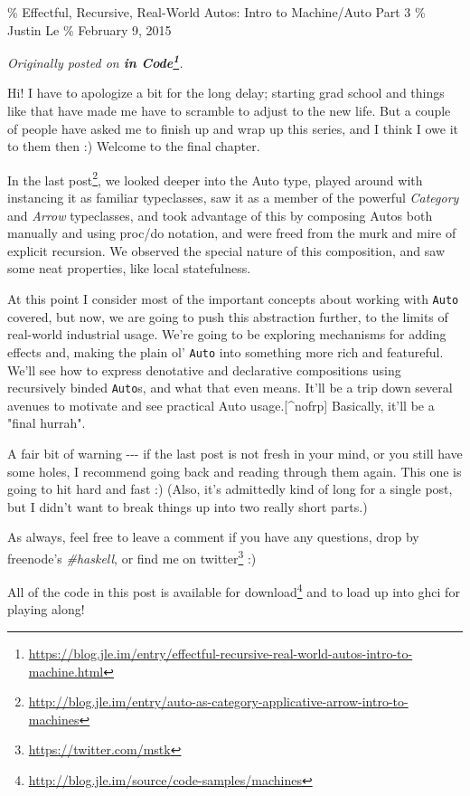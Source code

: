 \documentclass[]{article}
\renewcommand{\href}[2]{#2\footnote{\url{#1}}}
\begin{document}
\% Effectful, Recursive, Real-World Autos: Intro to Machine/Auto Part 3 \%
Justin Le \% February 9, 2015

\emph{Originally posted on
\textbf{\href{https://blog.jle.im/entry/effectful-recursive-real-world-autos-intro-to-machine.html}{in
Code}}.}

Hi! I have to apologize a bit for the long delay; starting grad school and
things like that have made me have to scramble to adjust to the new life. But a
couple of people have asked me to finish up and wrap up this series, and I think
I owe it to them then :) Welcome to the final chapter.

In the
\href{http://blog.jle.im/entry/auto-as-category-applicative-arrow-intro-to-machines}{last
post}, we looked deeper into the Auto type, played around with instancing it as
familiar typeclasses, saw it as a member of the powerful \emph{Category} and
\emph{Arrow} typeclasses, and took advantage of this by composing Autos both
manually and using proc/do notation, and were freed from the murk and mire of
explicit recursion. We observed the special nature of this composition, and saw
some neat properties, like local statefulness.

At this point I consider most of the important concepts about working with
\texttt{Auto} covered, but now, we are going to push this abstraction further,
to the limits of real-world industrial usage. We're going to be exploring
mechanisms for adding effects and, making the plain ol' \texttt{Auto} into
something more rich and featureful. We'll see how to express denotative and
declarative compositions using recursively binded \texttt{Auto}s, and what that
even means. It'll be a trip down several avenues to motivate and see practical
Auto usage.{[}\^{}nofrp{]} Basically, it'll be a "final hurrah".

A fair bit of warning -\/-\/- if the last post is not fresh in your mind, or you
still have some holes, I recommend going back and reading through them again.
This one is going to hit hard and fast :) (Also, it's admittedly kind of long
for a single post, but I didn't want to break things up into two really short
parts.)

As always, feel free to leave a comment if you have any questions, drop by
freenode's \emph{\#haskell}, or find me on
\href{https://twitter.com/mstk}{twitter} :)

All of the code in this post is
\href{http://blog.jle.im/source/code-samples/machines}{available for download}
and to load up into ghci for playing along!
\end{document}
